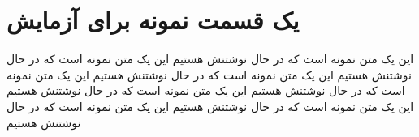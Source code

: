 \documentclass{article}
\begin{document}
\section{یک قسمت نمونه برای آزمایش}
این یک متن نمونه است که در حال نوشتنش هستیم  این یک متن نمونه است که در حال نوشتنش هستیم این یک متن نمونه است که در حال نوشتنش هستیم این یک متن نمونه است که در حال نوشتنش هستیم این یک متن نمونه است که در حال نوشتنش هستیم این یک متن نمونه است که در حال نوشتنش هستیم این یک متن نمونه است که در حال نوشتنش هستیم
\end{document}
